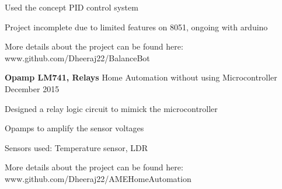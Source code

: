 \begin{cventries}
{\begin{cvitems}
         \item {Used the concept PID control system}
         \item {Project incomplete due to limited features on 8051, ongoing with arduino}
         \item {More details about the project can be found here: \textcolor{awesome-emerald}{www.github.com/Dheeraj22/BalanceBot}}
      \end{cvitems}
    }
    \cventry
    {\textbf{Opamp LM741, Relays}}
    {Home Automation without using Microcontroller}
    {}
    {December 2015}
    {
      \begin{cvitems}
        \item {Designed a relay logic circuit to mimick the microcontroller}
         \item {Opamps to amplify the sensor voltages}
         \item {Sensors used: Temperature sensor, LDR}
         \item {More details about the project can be found here: \textcolor{awesome-emerald}{www.github.com/Dheeraj22/AMEHomeAutomation}}
      \end{cvitems}
    }
\end{cventries}

